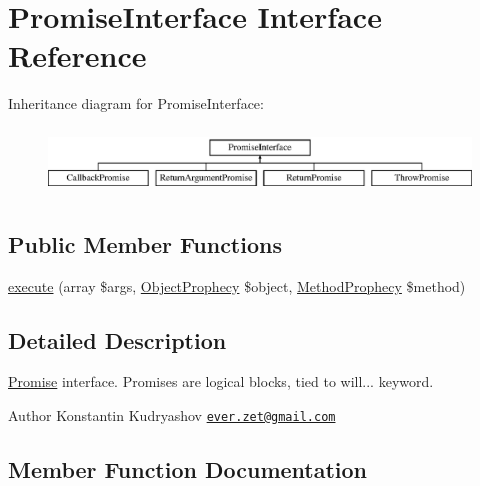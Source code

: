 \hypertarget{interface_prophecy_1_1_promise_1_1_promise_interface}{}\section{Promise\+Interface Interface Reference}
\label{interface_prophecy_1_1_promise_1_1_promise_interface}
Inheritance diagram for Promise\+Interface\+:\begin{figure}[H]
\begin{center}
\leavevmode
\includegraphics[height=1.794872cm]{interface_prophecy_1_1_promise_1_1_promise_interface}
\end{center}
\end{figure}
\subsection*{Public Member Functions}
\begin{DoxyCompactItemize}
\item 
\mbox{\hyperlink{interface_prophecy_1_1_promise_1_1_promise_interface_a2b8542872672f9ac4ed0c942f931f0c6}{execute}} (array \$args, \mbox{\hyperlink{class_prophecy_1_1_prophecy_1_1_object_prophecy}{Object\+Prophecy}} \$object, \mbox{\hyperlink{class_prophecy_1_1_prophecy_1_1_method_prophecy}{Method\+Prophecy}} \$method)
\end{DoxyCompactItemize}


\subsection{Detailed Description}
\mbox{\hyperlink{namespace_prophecy_1_1_promise}{Promise}} interface. Promises are logical blocks, tied to {\ttfamily will...} keyword.

\begin{DoxyAuthor}{Author}
Konstantin Kudryashov \href{mailto:ever.zet@gmail.com}{\tt ever.\+zet@gmail.\+com} 
\end{DoxyAuthor}


\subsection{Member Function Documentation}
\mbox{\label{interface_prophecy_1_1_promise_1_1_promise_interface_a2b8542872672f9ac4ed0c942f931f0c6}} 
